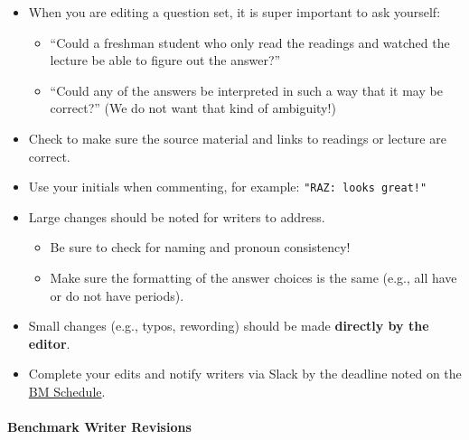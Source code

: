 \documentclass[
]{article}
\providecommand{\tightlist}{%
  \setlength{\itemsep}{0pt}\setlength{\parskip}{0pt}}
\begin{document}
\begin{itemize}
\item
  When you are editing a question set, it is super important to ask yourself:

  \begin{itemize}
  \tightlist
  \item
    ``Could a freshman student who only read the readings and watched the lecture be able to figure out the answer?''\\
  \item
    ``Could any of the answers be interpreted in such a way that it may be correct?'' (We do not want that kind of ambiguity!)
  \end{itemize}
\item
  Check to make sure the source material and links to readings or lecture are correct.
\item
  Use your initials when commenting, for example: \texttt{"RAZ:\ looks\ great!"}
\item
  Large changes should be noted for writers to address.

  \begin{itemize}
  \tightlist
  \item
    Be sure to check for naming and pronoun consistency!\\
  \item
    Make sure the formatting of the answer choices is the same (e.g., all have or do not have periods).
  \end{itemize}
\item
  Small changes (e.g., typos, rewording) should be made \textbf{directly by the editor}.
\item
  Complete your edits and notify writers via Slack by the deadline noted on the \href{https://docs.google.com/spreadsheets/d/1hingHbcfSHpUr1Km8NF4nnrDgw5ivD6b/edit?gid=602524248\#gid=602524248}{BM Schedule}.
\end{itemize}

\hypertarget{benchmark-writer-revisions}{%
\paragraph{Benchmark Writer Revisions}\label{benchmark-writer-revisions}}
\end{document}
